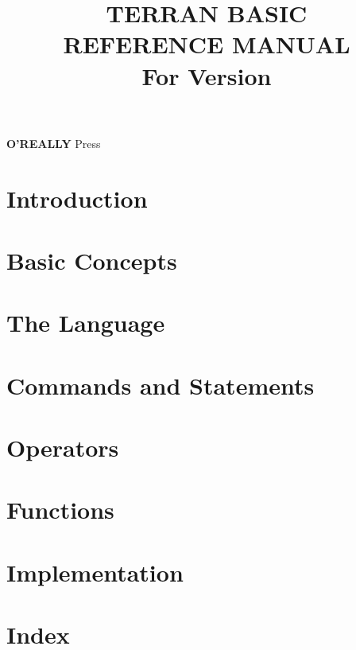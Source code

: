 \documentclass[10pt, stock, openany]{memoir}
\title{\HUGE\textbf{TERRAN BASIC \\ REFERENCE MANUAL} \\ \Large \vspace{1em} For Version \tbasver \\ \vspace{7mm} \theedition}
\date{}
\author{}
\newcommand{\oreallypress}{\large\textbf{O'REALLY\raisebox{1ex}{\scriptsize ?}} \normalsize Press}
\begin{document}
\begin{titlingpage}
\maketitle{}
\vfill
\oreallypress
\end{titlingpage}

\setcounter{page}{3}

\tableofcontents*



\openright
\chapter{Introduction}


\openany
\chapter{Basic Concepts}


\chapter{The Language}


\chapter{Commands and Statements}


\chapter{Operators}



\chapter{Functions}



\chapter{Implementation}




\chapter{Index}




\afterpage{\pagestyle{empty}\null\newpage}
\end{document}
